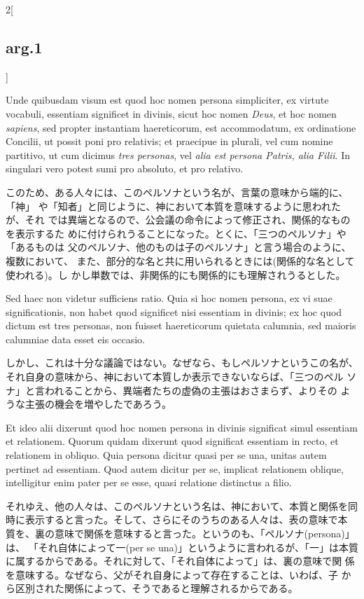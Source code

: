 \documentclass[paper=a4paper,fontsize=10pt,jafontsize=9pt,titlepage]{jlreq}
\begin{document}
\begin{paracol}{2}[\subsection{arg.1}]
\switchcolumn*

Unde quibusdam visum est quod
hoc nomen persona simpliciter, ex virtute vocabuli, essentiam significet
in divinis, sicut hoc nomen {\itshape Deus}, et hoc nomen {\itshape sapiens}, sed propter
instantiam haereticorum, est accommodatum, ex ordinatione Concilii, ut
possit poni pro relativis; et praecipue in plurali, vel cum nomine
partitivo, ut cum dicimus {\itshape tres personas}, vel {\itshape alia est persona Patris,
alia Filii}. 
In singulari vero potest sumi pro absoluto, et pro
relativo.

\switchcolumn

このため、ある人々には、このペルソナという名が、言葉の意味から端的に、「神」
 や「知者」と同じように、神において本質を意味するように思われたが、それ
 では異端となるので、公会議の命令によって修正され、関係的なものを表示するた
 めに付けられうることになった。とくに、「三つのペルソナ」や「あるものは
 父のペルソナ、他のものは子のペルソナ」と言う場合のように、複数において、
 また、部分的な名と共に用いられるときには(関係的な名として使われる)。し
 かし単数では、非関係的にも関係的にも理解されうるとした。

\switchcolumn*

Sed haec non videtur sufficiens ratio. Quia si hoc nomen
persona, ex vi suae significationis, non habet quod significet nisi
essentiam in divinis; ex hoc quod dictum est tres personas, non fuisset
haereticorum quietata calumnia, sed maioris calumniae data esset eis
occasio.

\switchcolumn

しかし、これは十分な議論ではない。なぜなら、もしペルソナというこの名が、
 それ自身の意味から、神において本質しか表示できないならば、「三つのペル
 ソナ」と言われることから、異端者たちの虚偽の主張はおさまらず、よりその
 ような主張の機会を増やしたであろう。

\switchcolumn*

Et ideo alii dixerunt quod hoc nomen persona in divinis
significat simul essentiam et relationem. Quorum quidam dixerunt quod
significat essentiam in recto, et relationem in obliquo. Quia persona
dicitur quasi per se una, unitas autem pertinet ad essentiam. Quod autem
dicitur per se, implicat relationem oblique, intelligitur enim pater per
se esse, quasi relatione distinctus a filio.

\switchcolumn

それゆえ、他の人々は、このペルソナという名は、神において、本質と関係を同
 時に表示すると言った。そして、さらにそのうちのある人々は、表の意味で本
 質を、裏の意味で関係を意味すると言った。というのも、「ペルソナ(persona)」は、
 「それ自体によって一(per se una)」というように言われるが、「一」は本質
 に属するからである。それに対して、「それ自体によって」は、裏の意味で関
 係を意味する。なぜなら、父がそれ自身によって存在することは、いわば、子
 から区別された関係によって、そうであると理解されるからである。


\end{paracol}
\end{document}
